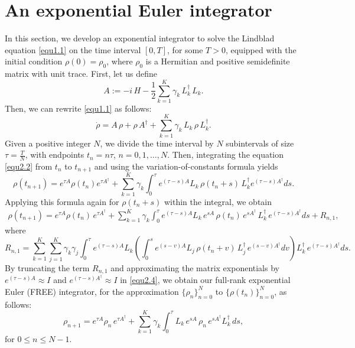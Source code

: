 \documentclass[10pt,a4paper]{amsart}
\begin{document}
\section{An exponential Euler integrator}
In this section, we develop an exponential integrator to solve the Lindblad equation \eqref{equ1.1} on the time interval $[0,T]$, for some $T>0$, equipped with the initial condition
$\rho(0)=\rho_0$, where $\rho_0$ is a Hermitian and positive semidefinite matrix with unit trace.
First, let us define
\begin{equation}\label{equ2.1}
  A:=- i \, H-\frac{1}{2}\sum_{k=1}^K\gamma_k \, L_k^{\dag} \, L_k.
\end{equation}
Then, we can rewrite \eqref{equ1.1} as follows:
\begin{equation}\label{equ2.2}
  \dot{\rho}=A \, \rho+\rho \,A^{\dag}+\sum_{k=1}^K\gamma_k \, L_k \, \rho \,L_k^{\dag}.
\end{equation}
Given a positive integer $N$, we divide the time interval by $N$
subintervals of size $\tau=\frac{T}{N}$, with endpoints
$t_n=n\tau$, $n=0,1,\ldots,N$. Then, integrating the equation \eqref{equ2.2} from $t_n$ to $t_{n+1}$ and using the variation-of-constants formula yields
\begin{equation}\label{equ2.3}
  \rho(t_{n+1})=e^{\tau A}\rho(t_n)e^{\tau A^{\dag}}+\sum_{k=1}^K\gamma_k\int_0^{\tau}e^{(\tau-s)A}L_k \, \rho(t_n+s) \, L_k^{\dag}e^{(\tau-s)A^{\dag}}ds.
\end{equation}
Applying this formula again for $\rho(t_n+s)$ within the integral, we obtain
\begin{eqnarray}\label{equ2.4}
  \rho(t_{n+1})=e^{\tau A} \rho(t_n) \, e^{\tau A^{\dag}}+\sum_{k=1}^K\gamma_k
  \int_0^{\tau}e^{(\tau-s)A}L_k \, e^{sA} \, \rho(t_n) \, e^{sA^{\dag}} \, L_k^{\dag} \, e^{(\tau-s)A^{\dag}}ds+R_{n,1},
\end{eqnarray}
where
\begin{equation}\label{equ2.4b}
  R_{n,1}=\sum_{k=1}^K\sum_{j=1}^K\gamma_k\gamma_j\int_0^{\tau}e^{(\tau-s)A}L_k
  \left(\int_0^se^{(s-v)A}L_j \, \rho(t_n+v) \, L_j^{\dag} \, e^{(s-v)A^{\dag}}dv\right)
  L_k^{\dag} \, e^{(\tau-s)A^{\dag}}ds.
\end{equation}
By truncating the term $R_{n,1}$ and approximating the matrix exponentials by $e^{(\tau-s)A}\approx I$ and $e^{(\tau-s)A^{\dag}}\approx I$ in \eqref{equ2.4}, we obtain our full-rank exponential Euler (FREE) integrator, for the approximation $\{\rho_n\}_{n=0}^N$ to $\{\rho(t_n)\}_{n=0}^N$, as follows:
\begin{equation}\label{equ2.5}
  \rho_{n+1}=e^{\tau A} \rho_n \, e^{\tau A^{\dag}}+\sum_{k=1}^K\gamma_k
  \int_0^{\tau}L_k \, e^{sA} \, \rho_n \, e^{sA^{\dag}} L_k^{\dag}\, ds ,
\end{equation}
for $0\leq n\leq N-1$.
\end{document}
